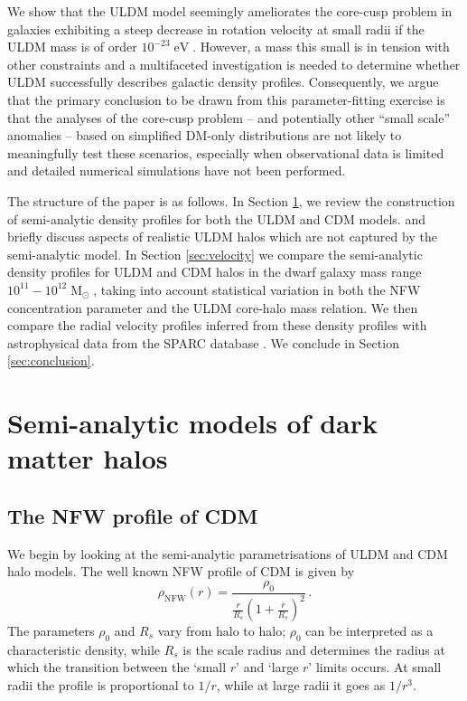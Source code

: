 \documentclass{pasa}%
\begin{document}
We show that  the ULDM model seemingly ameliorates the core-cusp problem in galaxies  exhibiting a steep decrease in rotation velocity at small radii if the ULDM mass is of order $10^{-23}\operatorname{eV}$. However, a mass this small is in tension with other   constraints and a multifaceted investigation is needed to determine whether ULDM successfully describes galactic density profiles. Consequently, we argue that the primary conclusion to be drawn from this parameter-fitting exercise is that the analyses of the core-cusp problem -- and potentially other ``small scale'' anomalies -- based on simplified DM-only distributions are not likely to meaningfully test these scenarios, especially when  observational data is limited and detailed numerical simulations have not been performed. 

The structure of the paper is as follows. In Section \ref{sec:models}, we review the construction of semi-analytic density profiles for both the ULDM and CDM models. and briefly discuss aspects of realistic ULDM halos which are not captured by the semi-analytic model. In Section \ref{sec:velocity} we compare the semi-analytic density profiles for ULDM and CDM halos in the dwarf galaxy mass range $10^{11} - 10^{12}\operatorname{M}_{\odot}$, taking into account statistical variation in both the NFW concentration parameter and the ULDM core-halo mass relation. We then compare the radial velocity profiles inferred from these density profiles with astrophysical data from the SPARC database \cite{Lelli:2016zqa}. We conclude in Section \ref{sec:conclusion}.

 
\section{Semi-analytic models of dark matter halos}\label{sec:models}


\subsection{The NFW profile of CDM}\label{sec:NFW}

We begin by looking at the semi-analytic parametrisations of ULDM and CDM halo models. The  well known  NFW   profile of CDM \cite{Navarro:1995iw, Maccio:2008pcd}  is given by
%
\begin{equation}\label{eq:nfw}
    \rho_\mathrm{NFW}(r)=\frac{\rho_0}{\frac{r}{R_s}\left(1+\frac{r}{R_s}\right)^2} \, .
\end{equation}
%
The parameters $\rho_0$ and $R_s$ vary from halo to halo; $\rho_0$ can be interpreted as a characteristic density, while $R_s$ is the scale radius and determines the radius at which the transition between the `small $r$' and `large $r$' limits occurs. At small radii the profile is proportional to $1/r$, while at large radii it goes as $1/r^3$.
\end{document}
